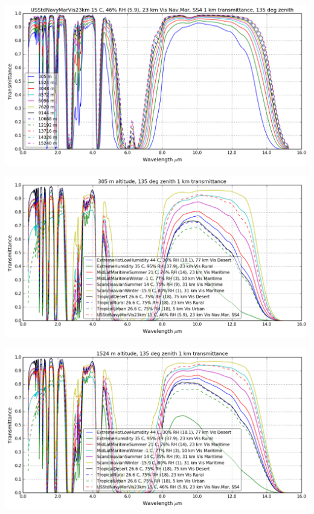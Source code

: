 \documentclass{workpackage}
\begin{document}
\begin{center}
\includegraphics{./pic/Analyse-Standard-Atmospheres_17_10.png}
\end{center}

\begin{center}
\includegraphics{./pic/Analyse-Standard-Atmospheres_17_11.png}
\end{center}

\begin{center}
\includegraphics{./pic/Analyse-Standard-Atmospheres_17_12.png}
\end{center}
\end{document}
